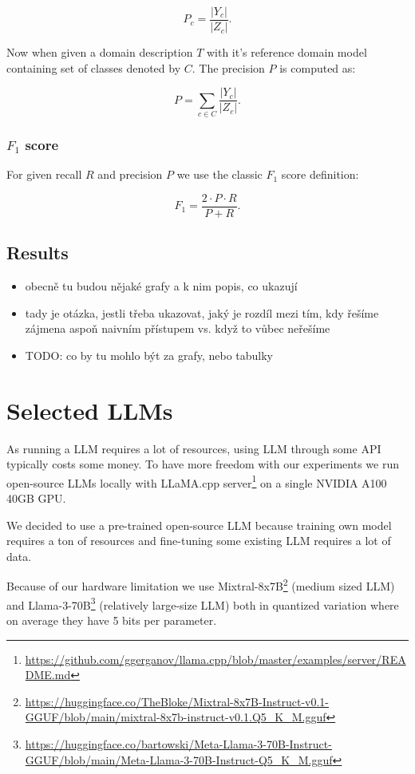 \[ P_c = \dfrac{|Y_c|}{|Z_c|}. \]

Now when given a domain description $T$ with it's reference domain model containing set of classes denoted by $C$. The precision $P$ is computed as:

\[ P = \sum_{c \in C}\dfrac{|Y_c|}{|Z_c|}. \]


\subsubsection{$F_1$ score}

For given recall $R$ and precision $P$ we use the classic $F_1$ score definition:

\[ F_1 = \dfrac{2 \cdot P \cdot R}{P + R}.\]

\subsection{Results}

\begin{itemize}
\item obecně tu budou nějaké grafy a k nim popis, co ukazují
\item tady je otázka, jestli třeba ukazovat, jaký je rozdíl mezi tím, kdy řešíme zájmena aspoň naivním přístupem vs. když to vůbec neřešíme
\item TODO: co by tu mohlo být za grafy, nebo tabulky
\end{itemize}


\section{Selected LLMs}

As running a LLM requires a lot of resources, using LLM through some API typically costs some money. To have more freedom with our experiments we run open-source LLMs locally with LLaMA.cpp server\footnote{\url{https://github.com/ggerganov/llama.cpp/blob/master/examples/server/README.md}} on a single NVIDIA A100 40GB GPU.

We decided to use a pre-trained open-source LLM because training own model requires a ton of resources and fine-tuning some existing LLM requires a lot of data.

Because of our hardware limitation we use Mixtral-8x7B\footnote{\url{https://huggingface.co/TheBloke/Mixtral-8x7B-Instruct-v0.1-GGUF/blob/main/mixtral-8x7b-instruct-v0.1.Q5_K_M.gguf}} (medium sized LLM) \cite{Jiang2024} and Llama-3-70B\footnote{\url{https://huggingface.co/bartowski/Meta-Llama-3-70B-Instruct-GGUF/blob/main/Meta-Llama-3-70B-Instruct-Q5_K_M.gguf}} (relatively large-size LLM) both in quantized variation where on average they have 5 bits per parameter.


